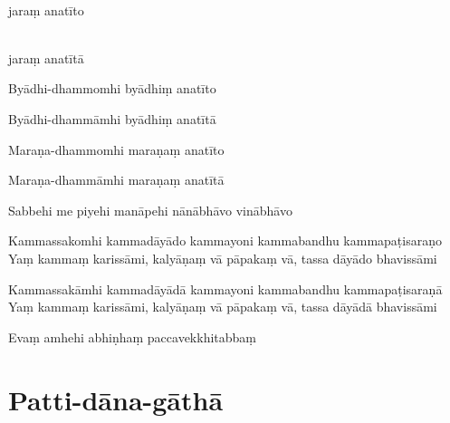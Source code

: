 
\\ jaraṃ anatīto

\\ jaraṃ anatītā

%
Byādhi-dhammomhi byādhiṃ anatīto

%
Byādhi-dhammāmhi byādhiṃ anatītā

%
Maraṇa-dhammomhi maraṇaṃ anatīto

%
Maraṇa-dhammāmhi maraṇaṃ anatītā

Sabbehi me piyehi manāpehi nānābhāvo vinābhāvo

%
Kammassakomhi kammadāyādo kammayoni kammabandhu kammapaṭisaraṇo\\
Yaṃ kammaṃ karissāmi, kalyāṇaṃ vā pāpakaṃ vā, tassa dāyādo bhavissāmi

%
Kammassakāmhi kammadāyādā kammayoni kammabandhu kammapaṭisaraṇā\\
Yaṃ kammaṃ karissāmi, kalyāṇaṃ vā pāpakaṃ vā, tassa dāyādā bhavissāmi

Evaṃ amhehi abhiṇhaṃ paccavekkhitabbaṃ\\

\vspace*{-\baselineskip}

\section{Patti-dāna-gāthā}

\begin{leader}
\end{leader}


\enlargethispage{\baselineskip}

